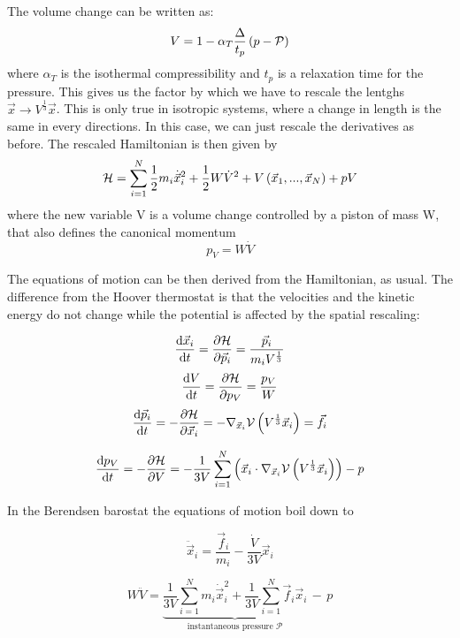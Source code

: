 The volume change can be written as: 
\begin{equation}
V = 1- \alpha_T \frac{\Delta}{t_p}\left(p-\mathcal{P}\right)
\end{equation} 
where $\alpha_T$ is the isothermal compressibility and $t_p$ is a relaxation time for the pressure. This gives us the factor by which we have to rescale the lentghs $\vec{x}\rightarrow V^\frac{1}{3}\vec{x}$. This is only true in isotropic systems, where a change in length is the same in every directions. In this case, we can just rescale the derivatives as before. The rescaled Hamiltonian is then given by
\begin{equation}
\mathcal{H} = \sum_{i=1}^N \frac{1}{2} m_i \dot{\vec{x}}_i^2  + \frac{1}{2} W\dot{V}^2 + V\left( \vec{x}_1,...,\vec{x}_N  \right) + pV
\end{equation} 
where the new variable V is a volume change controlled by a piston of mass W, that also defines the canonical momentum 
\begin{equation}
p_V= W\dot{V}
\end{equation} 

The equations of motion can be then derived from the Hamiltonian, as usual. The difference from the Hoover thermostat is that the velocities and the kinetic energy do not change while the potential is affected by the spatial rescaling:

$$
\frac{\text{d} \vec{x}_i}{\text{d} t} = \frac{\partial \mathcal{H}}{\partial \vec{p}_i} = \frac{\vec{p}_i}{m_i V^{\frac{1}{3}}}
$$
$$
\frac{\text{d} V}{\text{d} t} = \frac{\partial \mathcal{H}}{\partial p_V} = \frac{p_V}{W}
$$
$$
\frac{\text{d} \vec{p}_i}{\text{d} t} = - \frac{\partial \mathcal{H}}{\partial \vec{x}_i} = -\nabla_{\vec{x}_i} \mathcal{V}\left(V^{\frac{1}{3}}\vec{x}_i\right)= \vec{f}_i
$$


$$
\frac{\text{d} p_V}{\text{d} t} = - \frac{\partial \mathcal{H}}{\partial V} = -\frac{1}{3V}\sum_{i=1}^N\left(\vec{x}_i\cdot\nabla_{\vec{x}_i} \mathcal{V}\left(V^{\frac{1}{3}}\vec{x}_i\right)\right) -p
$$

In the Berendsen barostat the equations of motion boil down to



\begin{equation}
\ddot{\vec{x}}_i = \frac{\vec{f}_i}{m_i} - \frac{\dot{V}}{3V}\vec{x}_i
\end{equation} 

\begin{equation}
W\ddot{V} = \underbrace{\frac{1}{3V} \sum_{i=1}^N m_i \dot{\vec{x}}_i^2 + \frac{1}{3V} \sum_{i=1}^N \vec{f}_i\vec{x}_i}_{\text{instantaneous pressure }\mathcal{P}} \, - \,p
\end{equation} 



